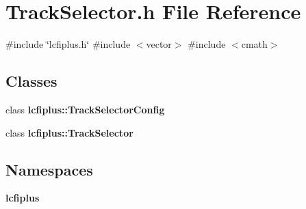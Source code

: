 \section{Track\+Selector.\+h File Reference}
\label{TrackSelector_8h}
{\ttfamily \#include \char`\"{}lcfiplus.\+h\char`\"{}}\newline
{\ttfamily \#include $<$vector$>$}\newline
{\ttfamily \#include $<$cmath$>$}\newline
\subsection*{Classes}
\begin{DoxyCompactItemize}
\item 
class \textbf{ lcfiplus\+::\+Track\+Selector\+Config}
\item 
class \textbf{ lcfiplus\+::\+Track\+Selector}
\end{DoxyCompactItemize}
\subsection*{Namespaces}
\begin{DoxyCompactItemize}
\item 
 \textbf{ lcfiplus}
\end{DoxyCompactItemize}
